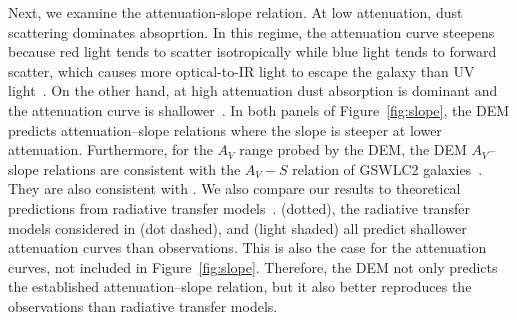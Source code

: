 Next, we examine the attenuation-slope relation. At low attenuation, dust scattering dominates absoprtion. In this regime,
the attenuation curve steepens because red light tends to
scatter isotropically while blue light tends to forward scatter, which causes
more optical-to-IR light to escape the galaxy than UV light~\citep{gordon1994,
witt2000, draine2003}. On the other hand, at high attenuation dust absorption 
is dominant and the attenuation curve is shallower~\citep{chevallard2013}.
In both panels of Figure~\ref{fig:slope}, the DEM predicts attenuation--slope
relations where the slope is steeper at lower attenuation. Furthermore, for the
$A_V$ range probed by the DEM, the DEM $A_V$--slope relations are consistent with 
the $A_V - S$ relation of GSWLC2 galaxies~\citep[black shaded][]{salim2020}.
They are also consistent with \cite{leja2017}. 
We also compare our results to theoretical predictions from radiative transfer
models~\citep{inoue2005, chevallard2013, trayford2020}. \cite{inoue2005}
(dotted), the radiative transfer models considered in \cite{chevallard2013}
(dot dashed), and \cite{trayford2020} (light shaded) all predict shallower 
attenuation curves than observations. This is also the case for the
\cite{narayanan2018} attenuation curves, not included in Figure~\ref{fig:slope}. 
Therefore, the DEM not only predicts the established attenuation--slope relation, 
but it also better reproduces the observations than radiative transfer models. 


